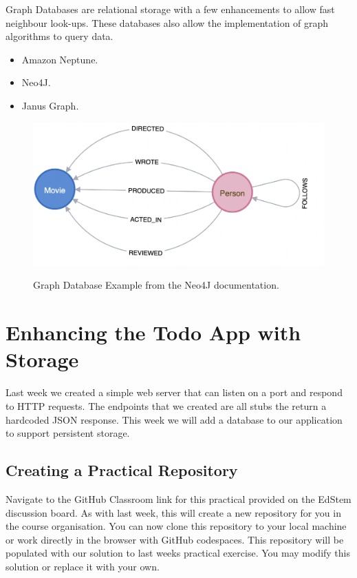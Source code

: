 \documentclass{csse4400}
\begin{document}
Graph Databases are relational storage with a few enhancements to allow fast neighbour look-ups.
These databases also allow the implementation of graph algorithms to query data.

\begin{itemize}
  \item Amazon Neptune.
  \item Neo4J.
  \item Janus Graph.
\end{itemize}

\begin{figure}[h]
  \href{https://neo4j.com/developer/example-project/}{
    \includegraphics[width=\textwidth]{images/graph}
  }
  \caption{Graph Database Example from the Neo4J documentation.}
\end{figure}

\section{Enhancing the Todo App with Storage}

Last week we created a simple web server that can listen on a port and respond to HTTP requests.
The endpoints that we created are all stubs the return a hardcoded JSON response.
This week we will add a database to our application to support persistent storage.


\subsection{Creating a Practical Repository}
Navigate to the GitHub Classroom link for this practical provided on the EdStem discussion board.
As with last week, this will create a new repository for you in the course organisation.
You can now clone this repository to your local machine or work directly in the browser with GitHub codespaces.
This repository will be populated with our solution to last weeks practical exercise.
You may modify this solution or replace it with your own.
\end{document}
